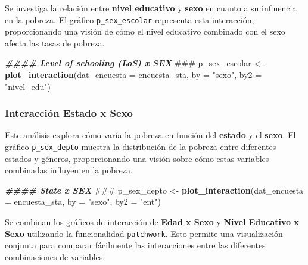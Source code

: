 \documentclass[
  12pt,
]{book}
\newenvironment{Shaded}{\begin{snugshade}}{\end{snugshade}}
\newcommand{\AlertTok}[1]{\textcolor[rgb]{0.94,0.16,0.16}{#1}}
\newcommand{\AttributeTok}[1]{\textcolor[rgb]{0.13,0.29,0.53}{#1}}
\newcommand{\DocumentationTok}[1]{\textcolor[rgb]{0.56,0.35,0.01}{\textbf{\textit{#1}}}}
\newcommand{\FunctionTok}[1]{\textcolor[rgb]{0.13,0.29,0.53}{\textbf{#1}}}
\newcommand{\NormalTok}[1]{#1}
\newcommand{\OtherTok}[1]{\textcolor[rgb]{0.56,0.35,0.01}{#1}}
\newcommand{\StringTok}[1]{\textcolor[rgb]{0.31,0.60,0.02}{#1}}
\begin{document}
Se investiga la relación entre \textbf{nivel educativo} y \textbf{sexo} en cuanto a su influencia en la pobreza. El gráfico \texttt{p\_sex\_escolar} representa esta interacción, proporcionando una visión de cómo el nivel educativo combinado con el sexo afecta las tasas de pobreza.

\begin{Shaded}
\begin{Highlighting}[]
\DocumentationTok{\#\#\#\# Level of schooling (LoS) x SEX }\AlertTok{\#\#\#}
\NormalTok{p\_sex\_escolar }\OtherTok{\textless{}{-}}
  \FunctionTok{plot\_interaction}\NormalTok{(}\AttributeTok{dat\_encuesta =}\NormalTok{ encuesta\_sta,}
                   \AttributeTok{by =} \StringTok{"sexo"}\NormalTok{,}
                   \AttributeTok{by2 =} \StringTok{"nivel\_edu"}\NormalTok{)}
\end{Highlighting}
\end{Shaded}

\hypertarget{interacciuxf3n-estado-x-sexo}{%
\subsubsection*{Interacción Estado x Sexo}\label{interacciuxf3n-estado-x-sexo}}

Este análisis explora cómo varía la pobreza en función del \textbf{estado} y el \textbf{sexo}. El gráfico \texttt{p\_sex\_depto} muestra la distribución de la pobreza entre diferentes estados y géneros, proporcionando una visión sobre cómo estas variables combinadas influyen en la pobreza.

\begin{Shaded}
\begin{Highlighting}[]
\DocumentationTok{\#\#\#\# State x SEX }\AlertTok{\#\#\#}
\NormalTok{p\_sex\_depto }\OtherTok{\textless{}{-}}
  \FunctionTok{plot\_interaction}\NormalTok{(}\AttributeTok{dat\_encuesta =}\NormalTok{ encuesta\_sta,}
                   \AttributeTok{by =} \StringTok{"sexo"}\NormalTok{,}
                   \AttributeTok{by2 =} \StringTok{"ent"}\NormalTok{)}
\end{Highlighting}
\end{Shaded}

Se combinan los gráficos de interacción de \textbf{Edad x Sexo} y \textbf{Nivel Educativo x Sexo} utilizando la funcionalidad \texttt{patchwork}. Esto permite una visualización conjunta para comparar fácilmente las interacciones entre las diferentes combinaciones de variables.
\end{document}
